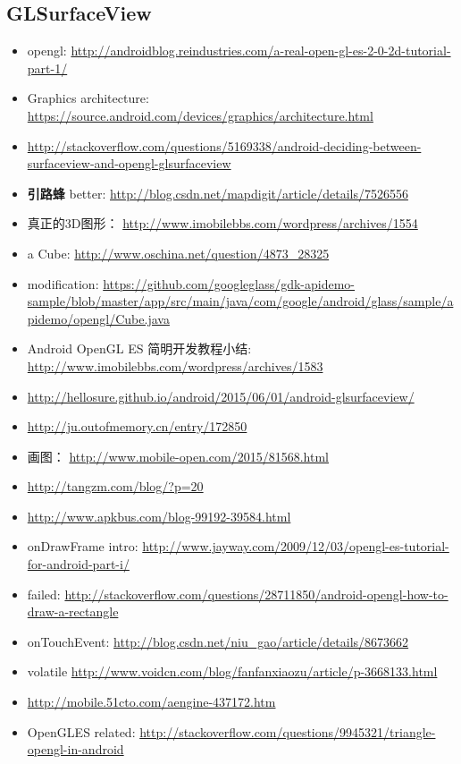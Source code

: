 \documentclass[9pt,b5paper]{article}
\begin{document}
\subsection{GLSurfaceView}
\label{sec-2-4}
\begin{itemize}
\item opengl: \url{http://androidblog.reindustries.com/a-real-open-gl-es-2-0-2d-tutorial-part-1/}
\item Graphics architecture: \url{https://source.android.com/devices/graphics/architecture.html}
\item \url{http://stackoverflow.com/questions/5169338/android-deciding-between-surfaceview-and-opengl-glsurfaceview}
\item \textbf{引路蜂} better: \url{http://blog.csdn.net/mapdigit/article/details/7526556}
\item 真正的3D图形： \url{http://www.imobilebbs.com/wordpress/archives/1554}
\item a Cube: \url{http://www.oschina.net/question/4873_28325}
\item modification: \url{https://github.com/googleglass/gdk-apidemo-sample/blob/master/app/src/main/java/com/google/android/glass/sample/apidemo/opengl/Cube.java}
\item Android OpenGL ES 简明开发教程小结: \url{http://www.imobilebbs.com/wordpress/archives/1583}
\item \url{http://hellosure.github.io/android/2015/06/01/android-glsurfaceview/}
\item \url{http://ju.outofmemory.cn/entry/172850}
\item 画图： \url{http://www.mobile-open.com/2015/81568.html}
\item \url{http://tangzm.com/blog/?p=20}
\item \url{http://www.apkbus.com/blog-99192-39584.html}
\item onDrawFrame intro: \url{http://www.jayway.com/2009/12/03/opengl-es-tutorial-for-android-part-i/}
\item failed: \url{http://stackoverflow.com/questions/28711850/android-opengl-how-to-draw-a-rectangle}
\item onTouchEvent: \url{http://blog.csdn.net/niu_gao/article/details/8673662}
\item volatile \url{http://www.voidcn.com/blog/fanfanxiaozu/article/p-3668133.html}
\item \url{http://mobile.51cto.com/aengine-437172.htm}
\item OpenGLES related: \url{http://stackoverflow.com/questions/9945321/triangle-opengl-in-android}

\end{itemize}
\end{document}
